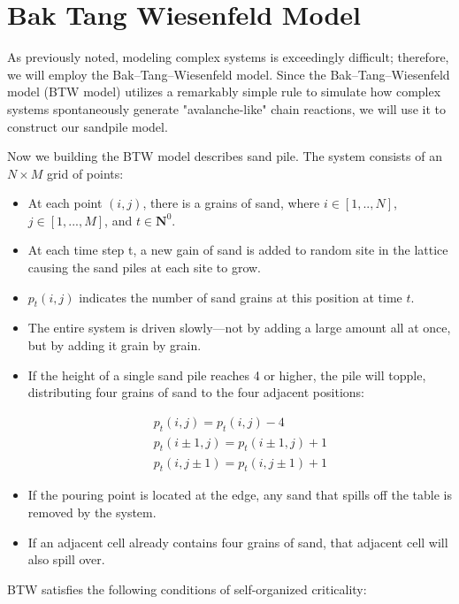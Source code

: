 \documentclass{article}
\begin{document}
\clearpage

\section{Bak Tang Wiesenfeld Model}
As previously noted, modeling complex systems is exceedingly difficult; therefore, we will employ the Bak–Tang–Wiesenfeld model. Since the Bak–Tang–Wiesenfeld model (BTW model) utilizes a remarkably simple rule to simulate how complex systems spontaneously generate "avalanche-like" chain reactions, we will use it to construct our sandpile model.

Now we building the BTW model describes sand pile. The system consists of an $N \times M$ grid of points:

\begin{itemize}
    \item At each point $(i, j)$, there is a grains of sand, where $i \in [1,..,N]$, $j\in[1,...,M]$, and $t\in \mathbf{N}^0$.
    \item At each time step t, a new gain of sand is added to random site in the lattice causing the sand piles at each site to grow.
    \item $p_t(i,j)$ indicates the number of sand grains at this position at time $t$.
    \item The entire system is driven slowly—not by adding a large amount all at once, but by adding it grain by grain.
    \item If the height of a single sand pile reaches 4 or higher, the pile will topple, distributing four grains of sand to the four adjacent positions:

    \begin{align}
    p_t(i,j) =p_t(i,j)-4 \\
    p_t (i\pm1,j) = p_t(i\pm1, j)+1 \\
    p_t (i,j\pm1) = p_t(i, j\pm1)+1
    \end{align}

    \item If the pouring point is located at the edge, any sand that spills off the table is removed by the system.

    \item If an adjacent cell already contains four grains of sand, that adjacent cell will also spill over.
\end{itemize}

BTW satisfies the following conditions of self-organized criticality:
\end{document}
